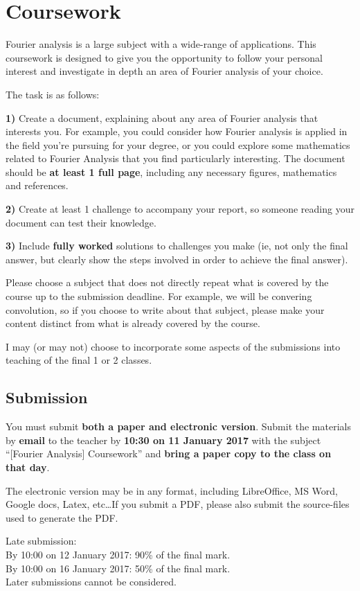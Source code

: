 \newpage
\section{Coursework}
Fourier analysis is a large subject with a wide-range of applications. This coursework is designed to give you the opportunity to follow your personal interest and investigate in depth an area of Fourier analysis of your choice.

The task is as follows:

\textbf{1)} Create a document, explaining about any area of Fourier analysis that interests you. For example, you could consider how Fourier analysis is applied in the field you're pursuing for your degree, or you could explore some mathematics related to Fourier Analysis that you find particularly interesting. The document should be \textbf{at least 1 full page}, including any necessary figures, mathematics and references.

\textbf{2)} Create at least 1 challenge to accompany your report, so someone reading your document can test their knowledge.

\textbf{3)} Include \textbf{fully worked} solutions to challenges you make (ie, not only the final answer, but clearly show the steps involved in order to achieve the final answer).

Please choose a subject that does not directly repeat what is covered by the course up to the submission deadline. For example, we will be convering convolution, so if you choose to write about that subject, please make your content distinct from what is already covered by the course.

I may (or may not) choose to incorporate some aspects of the submissions into teaching of the final 1 or 2 classes.

\subsection{Submission}
You must submit \textbf{both a paper and electronic version}. Submit the materials by \textbf{email} to the teacher by \textbf{10:30 on 11 January 2017} with the subject ``[Fourier Analysis] Coursework'' and \textbf{bring a paper copy to the class on that day}.

The electronic version may be in any format, including LibreOffice, MS Word, Google docs, Latex, etc\ldots If you submit a PDF, please also submit the source-files used to generate the PDF.

Late submission:\\
By 10:00 on 12 January 2017: 90\% of the final mark.\\
By 10:00 on 16 January 2017: 50\% of the final mark.\\
Later submissions cannot be considered.

